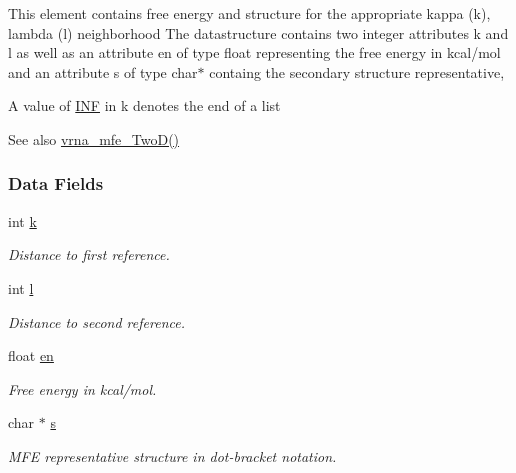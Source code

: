 This element contains free energy and structure for the appropriate kappa (k), lambda (l) neighborhood The datastructure contains two integer attributes \textquotesingle{}k\textquotesingle{} and \textquotesingle{}l\textquotesingle{} as well as an attribute \textquotesingle{}en\textquotesingle{} of type float representing the free energy in kcal/mol and an attribute \textquotesingle{}s\textquotesingle{} of type char$\ast$ containg the secondary structure representative,

A value of \mbox{\hyperlink{energy__const_8h_a12c2040f25d8e3a7b9e1c2024c618cb6}{I\+NF}} in k denotes the end of a list

\begin{DoxySeeAlso}{See also}
\mbox{\hyperlink{group__kl__neighborhood__mfe_ga243c288b463147352829df04de6a2f77}{vrna\+\_\+mfe\+\_\+\+Two\+D()}} 
\end{DoxySeeAlso}
\subsubsection*{Data Fields}
\begin{DoxyCompactItemize}
\item 
int \mbox{\hyperlink{group__kl__neighborhood__mfe_ac111e850bb3b3a11b6b5707912cfa1b8}{k}}
\begin{DoxyCompactList}\small\item\em Distance to first reference. \end{DoxyCompactList}\item 
int \mbox{\hyperlink{group__kl__neighborhood__mfe_ab8e95cd920901175a2cc8de726ab1d36}{l}}
\begin{DoxyCompactList}\small\item\em Distance to second reference. \end{DoxyCompactList}\item 
float \mbox{\hyperlink{group__kl__neighborhood__mfe_a7577863a6a84224dfee39b321c03cab1}{en}}
\begin{DoxyCompactList}\small\item\em Free energy in kcal/mol. \end{DoxyCompactList}\item 
char $\ast$ \mbox{\hyperlink{group__kl__neighborhood__mfe_ac5942d2505a6cd7e4a8073a321d5d2d5}{s}}
\begin{DoxyCompactList}\small\item\em M\+FE representative structure in dot-\/bracket notation. \end{DoxyCompactList}\end{DoxyCompactItemize}


